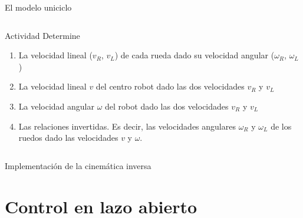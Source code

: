\documentclass[presentation,aspectratio=169]{beamer}
\begin{document}
\begin{frame}[label={sec:orgacc7098}]{El modelo uniciclo}
\begin{columns}
\begin{column}{0.6\columnwidth}
\alert{Actividad} Determine

\begin{enumerate}
\item La velocidad lineal (\(v_R\), \(v_L\)) de cada rueda dado su velocidad angular (\(\omega_R\), \(\omega_L\))

\item La velocidad lineal \(v\) del centro robot dado las dos velocidades \(v_R\) y \(v_L\)

\item La velocidad angular \(\omega\) del robot dado las dos velocidades \(v_R\) y \(v_L\)

\item Las relaciones invertidas. Es decir, las velocidades angulares \(\omega_R\) y \(\omega_L\) de los ruedos dado las velocidades \(v\) y \(\omega\).
\end{enumerate}
\end{column}
\end{columns}
\end{frame}


\begin{frame}[label={sec:orge03ac13}]{Implementación de la cinemática inversa}
\end{frame}

\section{Control en lazo abierto}
\label{sec:org08a6a61}
\end{document}
